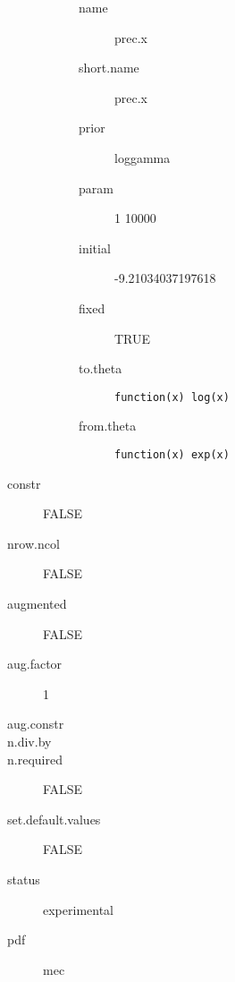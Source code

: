 \begin{description}
\begin{description}
\begin{description}
	 	 	 \item[ name ] prec.x 
	 	 	 \item[ short.name ] prec.x 
	 	 	 \item[ prior ] loggamma 
	 	 	 \item[ param ] 1 10000 
	 	 	 \item[ initial ] -9.21034037197618 
	 	 	 \item[ fixed ] TRUE 
	 	 	 \item[ to.theta ] \verb|function(x) log(x)| 
	 	 	 \item[ from.theta ] \verb|function(x) exp(x)| 
	 	 \end{description}
	 \end{description}
	 \item[ constr ] FALSE 
	 \item[ nrow.ncol ] FALSE 
	 \item[ augmented ] FALSE 
	 \item[ aug.factor ] 1 
	 \item[ aug.constr ]  
	 \item[ n.div.by ]  
	 \item[ n.required ] FALSE 
	 \item[ set.default.values ] FALSE 
	 \item[ status ] experimental 
	 \item[ pdf ] mec 
\end{description}
